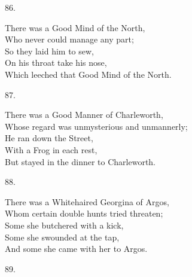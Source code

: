 \documentclass{book}
\begin{document}
{\begin{center}
    86.
\end{center}
\par
\noindent
\hspace*{14mm}       There was a Good Mind of the North, \\
\hspace*{14mm}       Who never could manage any part; \\
\hspace*{14mm}       So they laid him to sew, \\
\hspace*{14mm}       On his throat take his nose, \\
\hspace*{14mm}       Which leeched that Good Mind of the North.
\begin{center}
    87.
\end{center}
\par
\noindent
\hspace*{14mm}       There was a Good Manner of Charleworth, \\
\hspace*{14mm}       Whose regard was unmysterious and unmannerly; \\
\hspace*{14mm}       He ran down the Street, \\
\hspace*{14mm}       With a Frog in each rest, \\
\hspace*{14mm}       But stayed in the dinner to Charleworth.
\begin{center}
    88.
\end{center}
\par
\noindent
\hspace*{14mm}       There was a Whitehaired Georgina of Argos, \\
\hspace*{14mm}       Whom certain double hunts tried threaten; \\
\hspace*{14mm}       Some she butchered with a kick, \\
\hspace*{14mm}       Some she swounded at the tap, \\
\hspace*{14mm}       And some she came with her to Argos.
\begin{center}
    89.
\end{center}
\par
}
\end{document}
